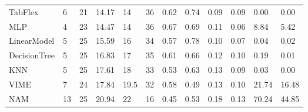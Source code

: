 \begin{tabular}{lllllrllllll}
TabFlex & 6 & 21 & 14.17 & 14 & 36 & 0.62 & 0.74 & 0.09 & 0.09 & 0.00 & 0.00 \\
MLP & 4 & 23 & 14.47 & 14 & 36 & 0.67 & 0.69 & 0.11 & 0.06 & 8.84 & 5.42 \\
LinearModel & 5 & 25 & 15.59 & 16 & 34 & 0.57 & 0.78 & 0.10 & 0.07 & 0.04 & 0.02 \\
DecisionTree & 5 & 25 & 16.83 & 17 & 35 & 0.61 & 0.66 & 0.12 & 0.10 & 0.19 & 0.01 \\
KNN & 5 & 25 & 17.61 & 18 & 33 & 0.53 & 0.63 & 0.13 & 0.09 & 0.03 & 0.00 \\
VIME & 7 & 24 & 17.84 & 19.5 & 32 & 0.58 & 0.49 & 0.13 & 0.10 & 21.74 & 16.48 \\
NAM & 13 & 25 & 20.94 & 22 & 16 & 0.45 & 0.53 & 0.18 & 0.13 & 70.24 & 44.85 \\
\bottomrule
\end{tabular}
